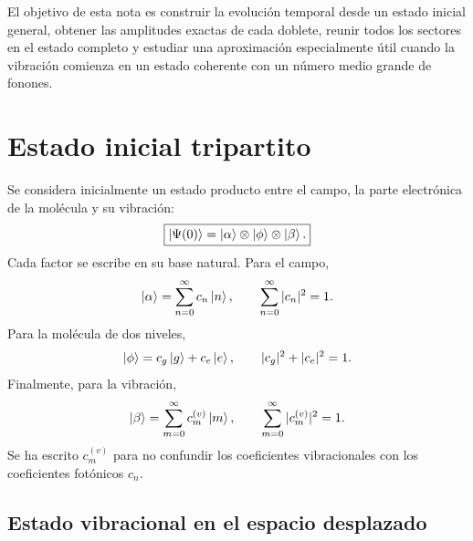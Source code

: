 \documentclass[11pt]{article}
\begin{document}
El objetivo de esta nota es construir la evoluci\'on temporal desde un estado
inicial general, obtener las amplitudes exactas de cada doblete, reunir todos
los sectores en el estado completo y estudiar una aproximaci\'on especialmente
\'util cuando la vibraci\'on comienza en un estado coherente con un n\'umero
medio grande de fonones.

\section{Estado inicial tripartito}

Se considera inicialmente un estado producto entre el campo, la parte
electr\'onica de la mol\'ecula y su vibraci\'on:
\begin{equation}
  \boxed{
  \ket{\Psi(0)}
  =
  \ket{\alpha}\otimes\ket{\phi}\otimes\ket{\beta}.
  }
\end{equation}
Cada factor se escribe en su base natural. Para el campo,
\begin{equation}
  \ket{\alpha}
  =
  \sum_{n=0}^{\infty}c_n\ket n,
  \qquad
  \sum_{n=0}^{\infty}|c_n|^2=1.
\end{equation}
Para la mol\'ecula de dos niveles,
\begin{equation}
  \ket{\phi}
  =
  c_g\ket g+c_e\ket e,
  \qquad
  |c_g|^2+|c_e|^2=1.
\end{equation}
Finalmente, para la vibraci\'on,
\begin{equation}
  \ket{\beta}
  =
  \sum_{m=0}^{\infty}c_m^{(v)}\ket m,
  \qquad
  \sum_{m=0}^{\infty}|c_m^{(v)}|^2=1.
\end{equation}
Se ha escrito $c_m^{(v)}$ para no confundir los coeficientes vibracionales con
los coeficientes fot\'onicos $c_n$.

\subsection{Estado vibracional en el espacio desplazado}
\end{document}
